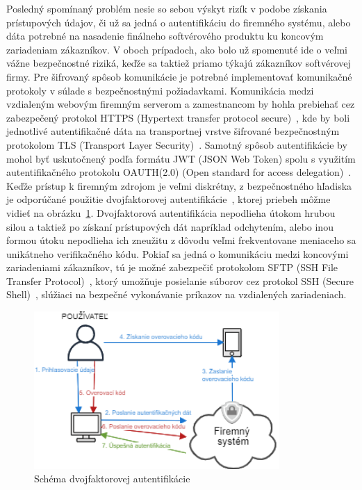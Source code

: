 \par Posledný spomínaný problém nesie so sebou výskyt rizík v podobe získania prístupových údajov, či už sa jedná o autentifikáciu
do firemného systému, alebo dáta potrebné na nasadenie finálneho softvérového produktu ku koncovým zariadeniam zákazníkov.
V oboch prípadoch, ako bolo už spomenuté ide o veľmi vážne bezpečnostné riziká, keďže sa taktiež priamo týkajú zákazníkov
softvérovej firmy. Pre šifrovaný spôsob komunikácie je potrebné implementovať komunikačné protokoly v súlade s bezpečnostnými
požiadavkami. Komunikácia medzi vzdialeným webovým firemným serverom a zamestnancom by hohla prebiehať cez zabezpečený protokol
HTTPS (Hypertext transfer protocol secure)~\cite{HTTPS}, kde by boli jednotlivé autentifikačné dáta na transportnej vrstve
šifrované bezpečnostným protokolom TLS (Transport Layer Security)~\cite{TLS}. Samotný spôsob autentifikácie by mohol byť
uskutočnený podľa formátu JWT (JSON Web Token) spolu s využitím autentifikačného protokolu OAUTH(2.0) (Open standard for
access delegation)~\cite{JWT}. Keďže prístup k firemným zdrojom je veľmi diskrétny, z bezpečnostného hľadiska je odporúčané
použitie dvojfaktorovej autentifikácie~\cite{DvojfaktorovaAutentifikacia}, ktorej priebeh môžme vidieť na obrázku~\ref{obr_6}.
Dvojfaktorová autentifikácia nepodlieha útokom hrubou silou a taktiež po získaní prístupových dát napríklad odchytením,
alebo inou formou útoku nepodlieha ich zneužitu z dôvodu veľmi frekventovane meniaceho sa unikátneho verifikačného kódu.
Pokiaľ sa jedná o komunikáciu medzi koncovými zariadeniami zákazníkov, tú je možné zabezpečiť protokolom SFTP (SSH File
Transfer Protocol)~\cite{SFTP}, ktorý umožňuje posielanie súborov cez protokol SSH (Secure Shell)~\cite{SSH}, slúžiaci
na bezpečné vykonávanie príkazov na vzdialených zariadeniach.

\begin{figure}[H]
\begin{center}\includegraphics[width=\textwidth,height=6cm,keepaspectratio=true]{assets/auth.png}\end{center}
\caption[Schéma dvojfaktorovej autentifikácie]{Schéma dvojfaktorovej autentifikácie}\label{obr_6}
\end{figure}

